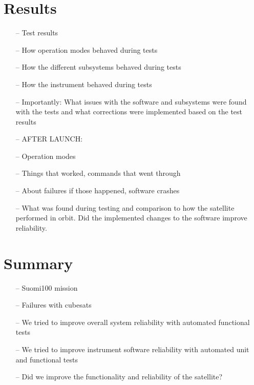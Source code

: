 \documentclass[english,12pt,a4paper,pdftex,elec,utf8]{aaltothesis}
\begin{document}
\section{Results}
\begin{itemize}
\item[--]Test results
\item[--]How operation modes behaved during tests
\item[--]How the different subsystems behaved during tests
\item[--]How the instrument behaved during tests
\item[--]Importantly: What issues with the software and subsystems were found with the tests and what corrections were implemented based on the test results
\item[--]AFTER LAUNCH:
\item[--]Operation modes
\item[--]Things that worked, commands that went through
\item[--]About failures if those happened, software crashes
\item[--]What was found during testing and comparison to how the satellite performed in orbit. Did the implemented changes to the software improve reliability.
\end{itemize}




\clearpage

\section{Summary} 

\begin{itemize}
\item[--]Suomi100 mission
\item[--]Failures with cubesats
\item[--]We tried to improve overall system reliability with automated functional tests
\item[--]We tried to improve instrument software reliability with automated unit and functional tests
\item[--]Did we improve the functionality and reliability of the satellite?

\end{itemize}
\end{document}

